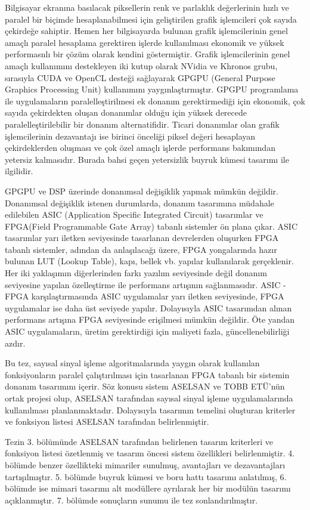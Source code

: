 Bilgisayar ekranına basılacak piksellerin renk ve parlaklık değerlerinin hızlı ve paralel bir biçimde hesaplanabilmesi için geliştirilen grafik işlemcileri çok sayıda çekirdeğe sahiptir.\cite{Kilgariff2005} Hemen her bilgisayarda bulunan grafik işlemcilerinin genel amaçlı paralel hesaplama gerektiren işlerde kullanılması ekonomik ve yüksek performasnlı bir çözüm olarak kendini göstermiştir. Grafik işlemcilerinin genel amaçlı kullanımını destekleyen iki kutup olarak NVidia ve Khronos grubu, sırasıyla CUDA ve OpenCL desteği sağlayarak GPGPU (General Purpose Graphics Processing Unit) kullanımını yaygınlaştırmıştır. \cite{kirk2007nvidia} \cite{stone2010opencl} GPGPU programlama ile uygulamaların paralelleştirilmesi ek donanım gerektirmediği için ekonomik, çok sayıda çekirdekten oluşan donanımlar olduğu için yüksek derecede paralelleştirilebilir bir donanım alternatifidir. Ticari donanımlar olan grafik işlemcilerinin dezavantajı ise birinci önceliği piksel değeri hesaplayan çekirdeklerden oluşması ve çok özel amaçlı işlerde performans bakımından yetersiz kalmasıdır. Burada bahsi geçen yetersizlik buyruk kümesi tasarımı ile ilgilidir.\par

GPGPU ve DSP üzerinde donanımsal değişiklik yapmak mümkün değildir. Donanımsal değişiklik istenen durumlarda, donanım tasarımına müdahale edilebilen ASIC (Application Specific Integrated Circuit) tasarımlar ve FPGA(Field Programmable Gate Array) tabanlı sistemler ön plana çıkar. ASIC tasarımlar yarı iletken seviyesinde tasarlanan devrelerden oluşurken FPGA tabanlı sistemler, adından da anlaşılacağı üzere, FPGA yongalarında hazır bulunan LUT (Lookup Table), kapı, bellek vb. yapılar kullanılarak gerçeklenir. Her iki yaklaşımın diğerlerinden farkı yazılım seviyesinde değil donanım seviyesine yapılan özelleştirme ile performans artışının sağlanmasıdır. ASIC - FPGA karşılaştırmasında ASIC uygulamalar yarı iletken seviyesinde, FPGA uygulamalar ise daha üst seviyede yapılır. Dolayısıyla ASIC tasarımdan alınan performans artışına FPGA seviyesinde erişilmesi mümkün değildir. Öte yandan ASIC uygulamaların, üretim gerektirdiği için maliyeti fazla, güncellenebilirliği azdır. \cite{kuon2007measuring} \par

Bu tez, sayısal sinyal işleme algoritmalarında yaygın olarak kullanılan fonksiyonların paralel çalıştırılması için tasarlanan FPGA tabanlı bir sistemin donanım tasarımını içerir. Söz konusu sistem ASELSAN ve TOBB ETÜ'nün ortak projesi olup, ASELSAN tarafından sayısal sinyal işleme uygulamalarında kullanılması planlanmaktadır. Dolayısıyla tasarımın temelini oluşturan kriterler ve fonksiyon listesi ASELSAN tarafından belirlenmiştir. \par

Tezin 3. bölümünde ASELSAN tarafından belirlenen tasarım kriterleri ve fonksiyon listesi özetlenmiş ve tasarım öncesi sistem özellikleri belirlenmiştir. 4. bölümde benzer özellikteki mimariler sunulmuş, avantajları ve dezavantajları tartışılmıştır. 5. bölümde buyruk kümesi ve boru hattı tasarımı anlatılmış, 6. bölümde ise mimari tasarımı alt modüllere ayrılarak her bir modülün tasarımı açıklanmıştır. 7. bölümde sonuçların sunumu ile tez sonlandırılmıştır.  
